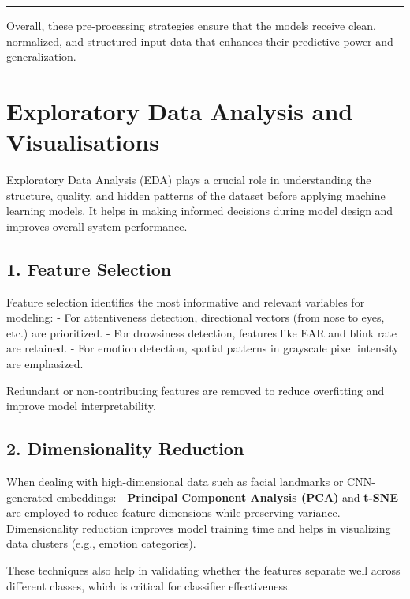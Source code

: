 \documentclass[
  letterpaper,
  DIV=11,
  numbers=noendperiod]{scrreport}
\begin{document}
\begin{center}\rule{0.5\linewidth}{0.5pt}\end{center}

Overall, these pre-processing strategies ensure that the models receive
clean, normalized, and structured input data that enhances their
predictive power and generalization.

\section{Exploratory Data Analysis and
Visualisations}\label{exploratory-data-analysis-and-visualisations}

Exploratory Data Analysis (EDA) plays a crucial role in understanding
the structure, quality, and hidden patterns of the dataset before
applying machine learning models. It helps in making informed decisions
during model design and improves overall system performance.

\subsection{1. Feature Selection}\label{feature-selection}

Feature selection identifies the most informative and relevant variables
for modeling: - For attentiveness detection, directional vectors (from
nose to eyes, etc.) are prioritized. - For drowsiness detection,
features like EAR and blink rate are retained. - For emotion detection,
spatial patterns in grayscale pixel intensity are emphasized.

Redundant or non-contributing features are removed to reduce overfitting
and improve model interpretability.

\subsection{2. Dimensionality Reduction}\label{dimensionality-reduction}

When dealing with high-dimensional data such as facial landmarks or
CNN-generated embeddings: - \textbf{Principal Component Analysis (PCA)}
and \textbf{t-SNE} are employed to reduce feature dimensions while
preserving variance. - Dimensionality reduction improves model training
time and helps in visualizing data clusters (e.g., emotion categories).

These techniques also help in validating whether the features separate
well across different classes, which is critical for classifier
effectiveness.
\end{document}
